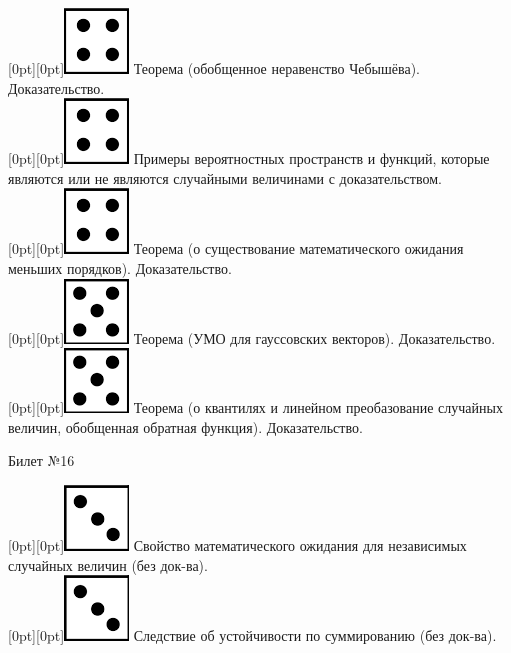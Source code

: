 \documentclass[10pt]{article}
\begin{document}
\raisebox{-1pt}[0pt][0pt]{\includegraphics[width=0.02\linewidth]{4.png}} Теорема (обобщенное неравенство Чебышёва). Доказательство. \\

\raisebox{-1pt}[0pt][0pt]{\includegraphics[width=0.02\linewidth]{4.png}} Примеры вероятностных пространств и функций, которые являются или не являются случайными величинами с доказательством. \\

\raisebox{-1pt}[0pt][0pt]{\includegraphics[width=0.02\linewidth]{4.png}} Теорема (о существование математического ожидания меньших порядков). Доказательство. \\

\raisebox{-1pt}[0pt][0pt]{\includegraphics[width=0.02\linewidth]{5.png}} Теорема (УМО для гауссовских векторов). Доказательство. \\

\raisebox{-1pt}[0pt][0pt]{\includegraphics[width=0.02\linewidth]{5.png}}   Теорема (о квантилях и линейном преобазование случайных величин, обобщенная обратная функция). Доказательство. \\

\begin{center} {\Large Билет №16} \end{center} 

\raisebox{-1pt}[0pt][0pt]{\includegraphics[width=0.02\linewidth]{3.png}} Свойство  математического ожидания для независимых случайных величин (без док-ва). \\

\raisebox{-1pt}[0pt][0pt]{\includegraphics[width=0.02\linewidth]{3.png}} Следствие об устойчивости по суммированию (без док-ва). \\
\end{document}
